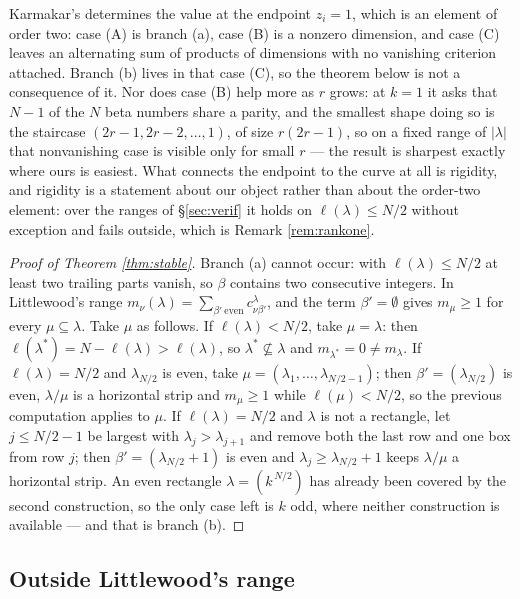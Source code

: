 \documentclass[11pt,reqno]{amsart}
\theoremstyle{plain}
\theoremstyle{definition}
\begin{document}
Karmakar's \cite[Theorem 4.1]{Kar24} determines the value at the endpoint $z_i=1$, which is an element
of order two: case (A) is branch (a), case (B) is a nonzero dimension, and case (C) leaves an
alternating sum of products of dimensions with no vanishing criterion attached. Branch (b) lives in
that case (C), so the theorem below is not a consequence of it. Nor does case (B) help more as $r$
grows: at $k=1$ it asks that $N-1$ of the $N$ beta numbers share a parity, and the smallest shape
doing so is the staircase $(2r-1,2r-2,\dots,1)$, of size $r(2r-1)$, so on a fixed range of
$|\lambda|$ that nonvanishing case is visible only for small $r$ --- the result is sharpest exactly
where ours is easiest. What connects the endpoint to the
curve at all is rigidity, and rigidity is a statement about our object rather than about the order-two
element: over the ranges of \S\ref{sec:verif} it holds on $\ell(\lambda)\le N/2$ without exception
and fails outside, which is Remark \ref{rem:rankone}.

\begin{proof}[Proof of Theorem \ref{thm:stable}]
Branch (a) cannot occur: with $\ell(\lambda)\le N/2$ at least two trailing parts vanish, so $\beta$
contains two consecutive integers. In Littlewood's range
$m_\nu(\lambda)=\sum_{\beta'\ \mathrm{even}}c^{\lambda}_{\nu\beta'}$, and the term $\beta'=\emptyset$
gives $m_\mu\ge1$ for every $\mu\subseteq\lambda$. Take $\mu$ as follows. If
$\ell(\lambda)<N/2$, take $\mu=\lambda$: then $\ell(\lambda^{*})=N-\ell(\lambda)>\ell(\lambda)$, so
$\lambda^{*}\not\subseteq\lambda$ and $m_{\lambda^{*}}=0\ne m_\lambda$. If $\ell(\lambda)=N/2$ and
$\lambda_{N/2}$ is even, take $\mu=(\lambda_1,\dots,\lambda_{N/2-1})$; then
$\beta'=(\lambda_{N/2})$ is even, $\lambda/\mu$ is a horizontal strip and $m_\mu\ge1$ while
$\ell(\mu)<N/2$, so the previous computation applies to $\mu$. If $\ell(\lambda)=N/2$ and $\lambda$
is not a rectangle, let $j\le N/2-1$ be largest with $\lambda_j>\lambda_{j+1}$ and remove both the
last row and one box from row $j$; then $\beta'=(\lambda_{N/2}+1)$ is even and
$\lambda_j\ge\lambda_{N/2}+1$ keeps $\lambda/\mu$ a horizontal strip. An even rectangle
$\lambda=(k^{\,N/2})$ has already been covered by the second construction, so the only case left is
$k$ odd, where neither construction is available --- and that is branch {\rm(b)}.
\end{proof}

\subsection{Outside Littlewood's range}\label{sec:unstable}
\end{document}

